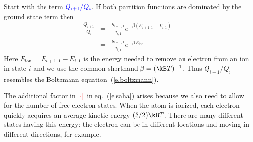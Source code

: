 Start with the term $\color{blue} Q_{i+1}/Q_{i}$. If both partition functions are dominated by the ground state term then
\begin{eqnarray*}
	\frac{Q_{i+1}}{Q_{i}} &=& \frac{g_{i+1,1}}{g_{i,1}} e^{-\beta (E_{i+1,1}-E_{i,1})}\\
	&=& \frac{g_{i+1,1}}{g_{i,1}} e^{-\beta\,E_{\mathrm{ion}}}
\end{eqnarray*}
Here $E_{\mathrm{ion}} = E_{i+1,1} - E_{i,1}$ is the energy needed to remove an electron from an ion in state $i$ and we use the common shorthand $\beta = (\kB T)^{-1}$. Thus $Q_{i+1}/Q_{i}$ resembles the Boltzmann equation~(\ref{e.boltzmann}).

The additional factor in $\color{red}\left[\cdot\right]$ in eq.~(\ref{e.saha}) arises because we also need to allow for the number of free electron states. When the atom is ionized, each electron quickly acquires an average kinetic energy $(3/2)\kB T$. There are many different states having this energy: the electron can be in different locations and moving in different directions, for example.  

